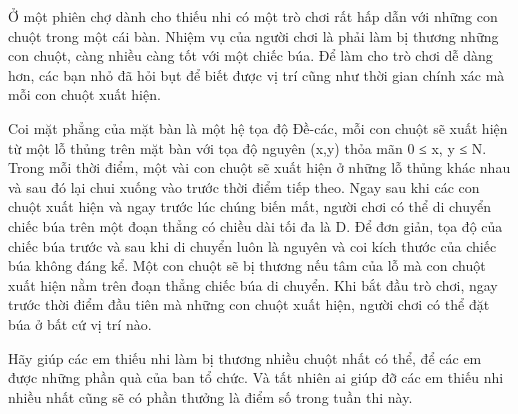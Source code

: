 Ở một phiên chợ dành cho thiếu nhi có một trò chơi rất hấp dẫn với những con chuột trong một cái bàn. Nhiệm vụ của người chơi là phải làm bị thương những con chuột, càng nhiều càng tốt với một chiếc búa. Để làm cho trò chơi dễ dàng hơn, các bạn nhỏ đã hỏi bụt để biết được vị trí cũng như thời gian chính xác mà mỗi con chuột xuất hiện.  

   Coi mặt phẳng của mặt bàn là một hệ tọa độ Đề-các, mỗi con chuột sẽ xuất hiện từ một lỗ thủng trên mặt bàn với tọa độ nguyên (x,y) thỏa mãn 0 ≤ x, y ≤ N. Trong mỗi thời điểm, một vài con chuột sẽ xuất hiện ở những lỗ thủng khác nhau và sau đó lại chui xuống vào trước thời điểm tiếp theo. Ngay sau khi các con chuột xuất hiện và ngay trước lúc chúng biến mất, người chơi có thể di chuyển chiếc búa trên một đoạn thẳng có chiều dài tối đa là D. Để đơn giản, tọa độ của chiếc búa trước và sau khi di chuyển luôn là nguyên và coi kích thước của chiếc búa không đáng kể. Một con chuột sẽ bị thương nếu tâm của lỗ mà con chuột xuất hiện nằm trên đoạn thẳng chiếc búa di chuyển. Khi bắt đầu trò chơi, ngay trước thời điểm đầu tiên mà những con chuột xuất hiện, người chơi có thể đặt búa ở bất cứ vị trí nào.  

   Hãy giúp các em thiếu nhi làm bị thương nhiều chuột nhất có thể, để các em được những phần quà của ban tổ chức. Và tất nhiên ai giúp đỡ các em thiếu nhi nhiều nhất cũng sẽ có phần thưởng là điểm số trong tuần thi này.